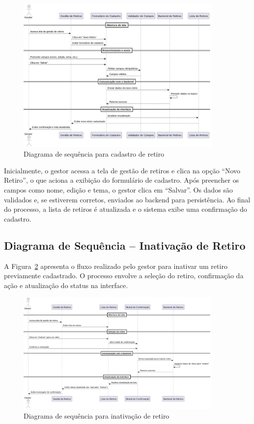 \begin{figure}[H]
    \centering
    \includegraphics[width=0.9\textwidth]{images/diagramasdesequencias/retreatCreate.png}
    \caption{Diagrama de sequência para cadastro de retiro}
    \label{fig:retreatCreate}
\end{figure}

Inicialmente, o gestor acessa a tela de gestão de retiros e clica na opção “Novo Retiro”, o que aciona a exibição do formulário de cadastro. Após preencher os campos como nome, edição e tema, o gestor clica em “Salvar”. Os dados são validados e, se estiverem corretos, enviados ao backend para persistência. Ao final do processo, a lista de retiros é atualizada e o sistema exibe uma confirmação do cadastro.

\subsection{Diagrama de Sequência – Inativação de Retiro}

A Figura~\ref{fig:retreatInativation} apresenta o fluxo realizado pelo gestor para inativar um retiro previamente cadastrado. O processo envolve a seleção do retiro, confirmação da ação e atualização do status na interface.

\begin{figure}[H]
    \centering
    \includegraphics[width=0.9\textwidth]{images/diagramasdesequencias/retreatInativation.png}
    \caption{Diagrama de sequência para inativação de retiro}
    \label{fig:retreatInativation}
\end{figure}

